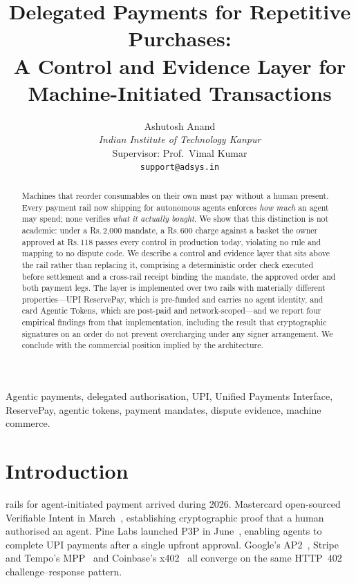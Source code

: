 \documentclass[journal,onecolumn,11pt]{IEEEtran}
\newcommand{\rs}{Rs.\,}
\begin{document}
\title{Delegated Payments for Repetitive Purchases:\\
A Control and Evidence Layer for Machine-Initiated Transactions}

\author{Ashutosh Anand\\
\textit{Indian Institute of Technology Kanpur}\\
Supervisor: Prof.\ Vimal Kumar\\
\texttt{support@adsys.in}}

\maketitle

\begin{abstract}
Machines that reorder consumables on their own must pay without a human present.
Every payment rail now shipping for autonomous agents enforces \emph{how much} an
agent may spend; none verifies \emph{what it actually bought}. We show that this
distinction is not academic: under a \rs 2{,}000 mandate, a \rs 600 charge against
a basket the owner approved at \rs 118 passes every control in production today,
violating no rule and mapping to no dispute code. We describe a control and
evidence layer that sits above the rail rather than replacing it, comprising a
deterministic order check executed before settlement and a cross-rail receipt
binding the mandate, the approved order and both payment legs. The layer is
implemented over two rails with materially different properties---UPI ReservePay,
which is pre-funded and carries no agent identity, and card Agentic Tokens, which
are post-paid and network-scoped---and we report four empirical findings from that
implementation, including the result that cryptographic signatures on an order do
not prevent overcharging under any signer arrangement. We conclude with the
commercial position implied by the architecture.
\end{abstract}

\begin{IEEEkeywords}
Agentic payments, delegated authorisation, UPI, Unified Payments Interface,
ReservePay, agentic tokens, payment mandates, dispute evidence, machine commerce.
\end{IEEEkeywords}

\section{Introduction}
 rails for agent-initiated payment arrived during 2026. Mastercard
open-sourced Verifiable Intent in March~\cite{mc-vi}, establishing cryptographic proof
that a human authorised an agent. Pine Labs launched P3P in June~\cite{p3p}, enabling
agents to complete UPI payments after a single upfront approval. Google's AP2~\cite{ap2},
Stripe and Tempo's MPP~\cite{mpp} and Coinbase's x402~\cite{x402} all converge on the
same HTTP~402 challenge--response pattern.
\end{document}
